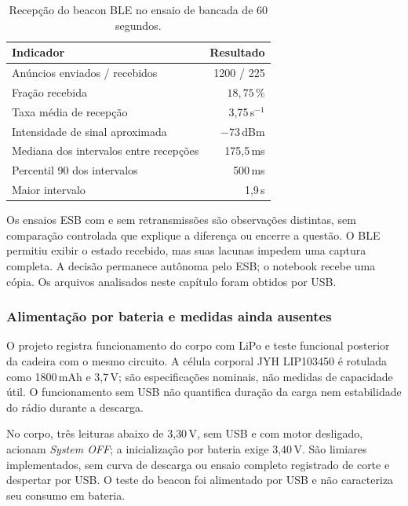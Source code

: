 \begin{table}[H]
  \centering
  \caption{Recepção do beacon BLE no ensaio de bancada de 60 segundos.}
  \label{tab:res-ble}
  \begin{singlespace}
  \begin{tabularx}{\linewidth}{Xr}
    \toprule
    Indicador & Resultado \\
    \midrule
    Anúncios enviados / recebidos & 1200 / 225 \\
    Fração recebida & $18{,}75\,\%$ \\
    Taxa média de recepção & 3{,}75\,s$^{-1}$ \\
    Intensidade de sinal aproximada & $-73$\,dBm \\
    Mediana dos intervalos entre recepções & 175{,}5\,ms \\
    Percentil 90 dos intervalos & 500\,ms \\
    Maior intervalo & 1{,}9\,s \\
    \bottomrule
  \end{tabularx}
  \end{singlespace}
\end{table}

Os ensaios ESB com e sem retransmissões são observações distintas, sem
comparação controlada que explique a diferença ou encerre a questão.
O BLE permitiu exibir o estado recebido, mas suas lacunas impedem uma
captura completa. A decisão permanece autônoma pelo ESB; o notebook recebe
uma cópia. Os arquivos analisados neste capítulo foram obtidos por USB.

\subsubsection{Alimentação por bateria e medidas ainda ausentes}

O projeto registra funcionamento do corpo com LiPo e teste funcional
posterior da cadeira com o mesmo circuito. A célula corporal JYH LIP103450
é rotulada como 1800\,mAh e 3{,}7\,V; são especificações nominais, não
medidas de capacidade útil. O funcionamento sem USB não quantifica duração
da carga nem estabilidade do rádio durante a descarga.

No corpo, três leituras abaixo de 3{,}30\,V, sem USB e com motor desligado,
acionam \textit{System OFF}; a inicialização por bateria exige
3{,}40\,V. São limiares implementados, sem curva de descarga ou ensaio
completo registrado de corte e despertar por USB. O teste do beacon foi
alimentado por USB e não caracteriza seu consumo em bateria.


